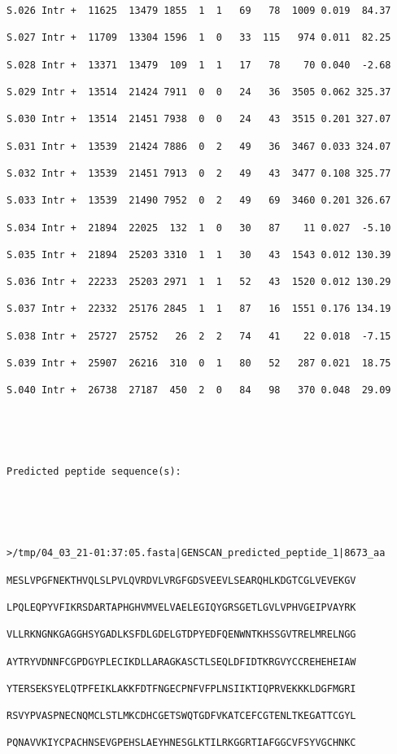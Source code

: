\documentclass[en,black,10pt,normal]{elegantnote}
\begin{document}
\begin{lstlisting}[frame=single]
S.026 Intr +  11625  13479 1855  1  1   69   78  1009 0.019  84.37

S.027 Intr +  11709  13304 1596  1  0   33  115   974 0.011  82.25

S.028 Intr +  13371  13479  109  1  1   17   78    70 0.040  -2.68

S.029 Intr +  13514  21424 7911  0  0   24   36  3505 0.062 325.37

S.030 Intr +  13514  21451 7938  0  0   24   43  3515 0.201 327.07

S.031 Intr +  13539  21424 7886  0  2   49   36  3467 0.033 324.07

S.032 Intr +  13539  21451 7913  0  2   49   43  3477 0.108 325.77

S.033 Intr +  13539  21490 7952  0  2   49   69  3460 0.201 326.67

S.034 Intr +  21894  22025  132  1  0   30   87    11 0.027  -5.10

S.035 Intr +  21894  25203 3310  1  1   30   43  1543 0.012 130.39

S.036 Intr +  22233  25203 2971  1  1   52   43  1520 0.012 130.29

S.037 Intr +  22332  25176 2845  1  1   87   16  1551 0.176 134.19

S.038 Intr +  25727  25752   26  2  2   74   41    22 0.018  -7.15

S.039 Intr +  25907  26216  310  0  1   80   52   287 0.021  18.75

S.040 Intr +  26738  27187  450  2  0   84   98   370 0.048  29.09





Predicted peptide sequence(s):





>/tmp/04_03_21-01:37:05.fasta|GENSCAN_predicted_peptide_1|8673_aa

MESLVPGFNEKTHVQLSLPVLQVRDVLVRGFGDSVEEVLSEARQHLKDGTCGLVEVEKGV

LPQLEQPYVFIKRSDARTAPHGHVMVELVAELEGIQYGRSGETLGVLVPHVGEIPVAYRK

VLLRKNGNKGAGGHSYGADLKSFDLGDELGTDPYEDFQENWNTKHSSGVTRELMRELNGG

AYTRYVDNNFCGPDGYPLECIKDLLARAGKASCTLSEQLDFIDTKRGVYCCREHEHEIAW

YTERSEKSYELQTPFEIKLAKKFDTFNGECPNFVFPLNSIIKTIQPRVEKKKLDGFMGRI

RSVYPVASPNECNQMCLSTLMKCDHCGETSWQTGDFVKATCEFCGTENLTKEGATTCGYL

PQNAVVKIYCPACHNSEVGPEHSLAEYHNESGLKTILRKGGRTIAFGGCVFSYVGCHNKC


\end{lstlisting}
\end{document}
